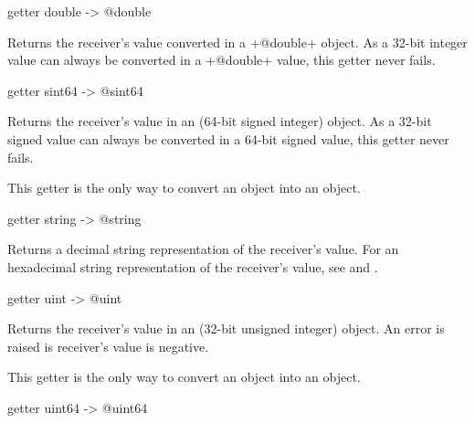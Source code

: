 \begin{galgas}
getter double -> @double
\end{galgas}

Returns the receiver's value converted in a \ggs+@double+ object. As a 32-bit integer value can always be converted in a \ggs+@double+ value, this getter never fails.






\begin{galgas}
getter sint64 -> @sint64
\end{galgas}

Returns the receiver's value in an  (64-bit signed integer) object. As a 32-bit signed value can always be converted in a 64-bit signed value, this getter never fails.

This getter is the only way to convert an  object into an  object.






\begin{galgas}
getter string -> @string
\end{galgas}

Returns a decimal string representation of the receiver's value. For an hexadecimal string representation of the receiver's value, see  and .








\begin{galgas}
getter uint -> @uint
\end{galgas}

Returns the receiver's value in an  (32-bit unsigned integer) object. An error is raised is receiver's value is negative.

This getter is the only way to convert an  object into an  object.





\begin{galgas}
getter uint64 -> @uint64
\end{galgas}

